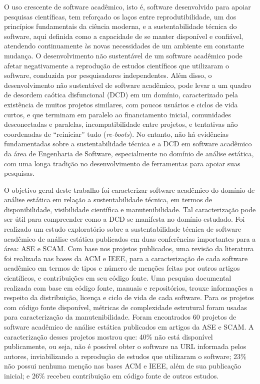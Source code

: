 O uso crescente de software acadêmico, isto é, 
software desenvolvido para apoiar pesquisas científicas,
tem reforçado os laços entre 
reprodutibilidade, um dos princípios fundamentais da ciência moderna,
e a sustentabilidade técnica do software,
aqui definida como a capacidade de se manter disponível e confiável,
atendendo continuamente às novas necessidades de um ambiente em constante mudança.
%
O desenvolvimento não sustentável de um software acadêmico pode 
afetar negativamente a reprodução de estudos científicos que utilizaram o software,
conduzida por pesquisadores independentes. 
Além disso, o desenvolvimento não sustentável de software acadêmico,
pode levar a um quadro de desordem caótica disfuncional (DCD) em um domínio,
caracterizado pela existência de muitos projetos similares, com poucos
usuários e ciclos de vida curtos, e que terminam em paralelo ao financiamento
inicial,  comunidades desconectadas e paralelas, incompatibilidade entre
projetos, e tentativas não coordenadas de ``reiniciar'' tudo
({\it re-boots}).
%
No entanto, não há evidências fundamentadas sobre a sustentabilidade técnica
e a DCD em software acadêmico da área de Engenharia de Software, especialmente
no domínio de análise estática, com uma longa tradição no
desenvolvimento de ferramentas para apoiar suas pesquisas.

O objetivo geral deste trabalho foi 
caracterizar software acadêmico do domínio de análise estática 
em relação a sustentabilidade técnica, 
em termos de disponibilidade, visibilidade científica e manutenibilidade.
Tal caracterização pode ser útil para compreender como a DCD se manifesta
no domínio estudado.
%
Foi realizado um estudo exploratório sobre a sustentabilidade
técnica de software acadêmico de análise estática 
publicados em duas conferências importantes para a área: ASE e SCAM.
%
Com base nos projetos publicados,  %
uma revisão da literatura foi realizada nas bases da ACM e IEEE, 
para a caracterização de cada software acadêmico 
em termos de tipos e número de menções feitas por outros artigos científicos,
e contribuições em seu código fonte.
Uma pesquisa documental realizada com base em 
código fonte, manuais e repositórios, trouxe informações a respeito da
distribuição, licença e ciclo de vida de cada software.
Para os projetos com código fonte disponível, métricas de
complexidade estrutural foram usadas para caracterização da manutenibilidade.
%
Foram encontrados 60 projetos de software acadêmico de análise estática
publicados em artigos da ASE e SCAM.
%
A caracterização desses projetos mostrou que: 
40\% não está disponível publicamente, ou seja, 
não é possível obter o software na URL informada pelos autores, 
inviabilizando a reprodução de estudos que utilizaram o software;
%
23\% não possui nenhuma menção nas bases ACM e IEEE, além de sua publicação inicial; e
26\% recebeu contribuição em código fonte de outros estudos.

